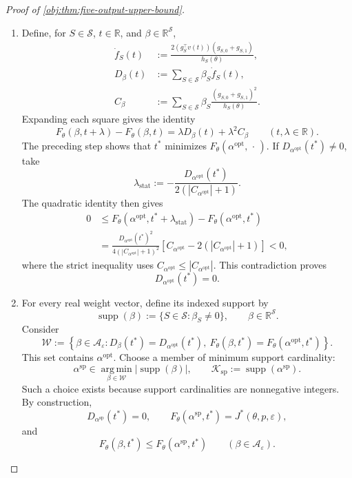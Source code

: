 \documentclass[11pt]{article}
\begin{document}
\begin{proof}[Proof of \cref{obj:thm:five-output-upper-bound}]
\begin{enumerate}
\item
Define, for \(S\in\mathcal S\), \(t\in\mathbb R\), and
\(\beta\in\mathbb R^{\mathcal S}\),
\[
\begin{aligned}
\dot f_S(t)
&:=\frac{2(g_S^\top v(t))(g_{S,0}+g_{S,1})}{h_S(\theta)},\\
D_\beta(t)&:=\sum_{S\in\mathcal S}\beta_S\dot f_S(t),\\
C_\beta&:=\sum_{S\in\mathcal S}
\beta_S\frac{(g_{S,0}+g_{S,1})^2}{h_S(\theta)}.
\end{aligned}
\]
Expanding each square gives the identity
\[
F_\theta(\beta,t+\lambda)-F_\theta(\beta,t)
=
\lambda D_\beta(t)+\lambda^2C_\beta
\qquad(t,\lambda\in\mathbb R).
\]
The preceding step shows that \(t^*\) minimizes
\(F_\theta(\alpha^{\mathrm{opt}},\,\cdot\,)\).
If \(D_{\alpha^{\mathrm{opt}}}(t^*)\ne0\), take
\[
\lambda_{\mathrm{stat}}
:=
-\frac{D_{\alpha^{\mathrm{opt}}}(t^*)}
{2(|C_{\alpha^{\mathrm{opt}}}|+1)}.
\]
The quadratic identity then gives
\[
\begin{aligned}
0
&\le
F_\theta(\alpha^{\mathrm{opt}},t^*+\lambda_{\mathrm{stat}})
-F_\theta(\alpha^{\mathrm{opt}},t^*)\\
&=
\frac{D_{\alpha^{\mathrm{opt}}}(t^*)^2}
{4(|C_{\alpha^{\mathrm{opt}}}|+1)^2}
\left[
C_{\alpha^{\mathrm{opt}}}
-2(|C_{\alpha^{\mathrm{opt}}}|+1)
\right]
<0,
\end{aligned}
\]
where the strict inequality uses
\(C_{\alpha^{\mathrm{opt}}}\le|C_{\alpha^{\mathrm{opt}}}|\).
This contradiction proves
\[
D_{\alpha^{\mathrm{opt}}}(t^*)=0.
\]

\item
For every real weight vector, define its indexed support by
\[
\operatorname{supp}(\beta)
:=\{S\in\mathcal S:\beta_S\ne0\},
\qquad \beta\in\mathbb R^{\mathcal S}.
\]
Consider
\[
\mathcal W:=
\left\{\beta\in\mathcal A_\varepsilon:
D_\beta(t^*)=D_{\alpha^{\mathrm{opt}}}(t^*),\
F_\theta(\beta,t^*)=F_\theta(\alpha^{\mathrm{opt}},t^*)
\right\}.
\]
This set contains \(\alpha^{\mathrm{opt}}\).
Choose a member of minimum support cardinality:
\[
\alpha^{\mathrm{sp}}
\in\operatorname*{arg\,min}_{\beta\in\mathcal W}
|\operatorname{supp}(\beta)|,
\qquad
\mathcal K_{\mathrm{sp}}:=\operatorname{supp}(\alpha^{\mathrm{sp}}).
\]
Such a choice exists because support cardinalities are nonnegative
integers. By construction,
\[
D_{\alpha^{\mathrm{sp}}}(t^*)=0,
\qquad
F_\theta(\alpha^{\mathrm{sp}},t^*)=J^*(\theta,p,\varepsilon),
\]
and
\[
F_\theta(\beta,t^*)\le F_\theta(\alpha^{\mathrm{sp}},t^*)
\qquad(\beta\in\mathcal A_\varepsilon).
\]


\end{enumerate}
\end{proof}
\end{document}
